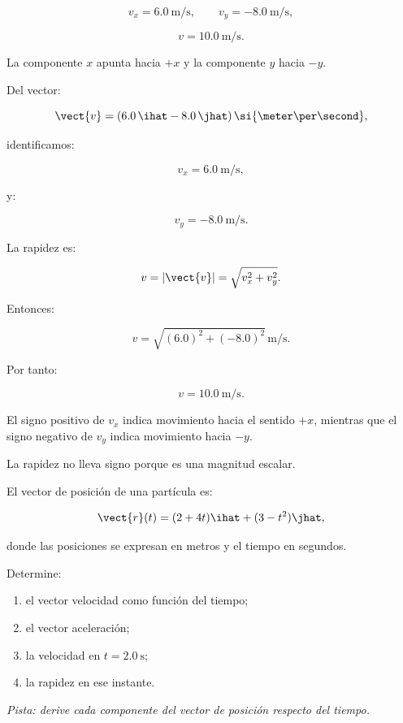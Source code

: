 \begin{respuesta}
\[
v_x=\SI{6.0}{\meter\per\second},
\qquad
v_y=-\SI{8.0}{\meter\per\second},
\]

\[
\boxed{v=\SI{10.0}{\meter\per\second}}.
\]

La componente \(x\) apunta hacia \(+x\) y la componente \(y\) hacia \(-y\).
\end{respuesta}

\begin{explicacion}
Del vector:

\[
\vect{v}
=
(6.0\,\ihat-8.0\,\jhat)\,
\si{\meter\per\second},
\]

identificamos:

\[
v_x=\SI{6.0}{\meter\per\second},
\]

y:

\[
v_y=-\SI{8.0}{\meter\per\second}.
\]

La rapidez es:

\[
v=|\vect{v}|
=
\sqrt{v_x^2+v_y^2}.
\]

Entonces:

\[
v
=
\sqrt{(6.0)^2+(-8.0)^2}
\,\si{\meter\per\second}.
\]

Por tanto:

\[
\boxed{v=\SI{10.0}{\meter\per\second}}.
\]

El signo positivo de \(v_x\) indica movimiento hacia el sentido \(+x\), mientras que el signo negativo de \(v_y\) indica movimiento hacia \(-y\).

La rapidez no lleva signo porque es una magnitud escalar.
\end{explicacion}


\begin{ejercicio}
El vector de posición de una partícula es:

\[
\vect{r}(t)
=
(2+4t)\ihat
+
(3-t^2)\jhat,
\]

donde las posiciones se expresan en metros y el tiempo en segundos.

Determine:

\begin{enumerate}[label=\alph*)]
    \item el vector velocidad como función del tiempo;
    \item el vector aceleración;
    \item la velocidad en \(t=\SI{2.0}{\second}\);
    \item la rapidez en ese instante.
\end{enumerate}

\textit{Pista: derive cada componente del vector de posición respecto del tiempo.}
\end{ejercicio}

